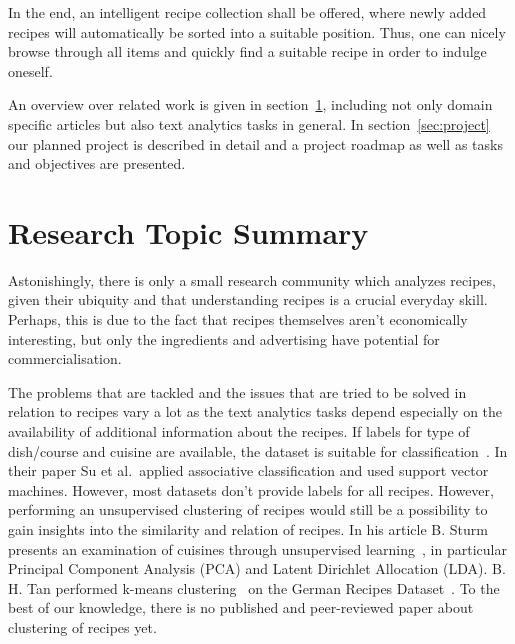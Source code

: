 \documentclass[
     12pt,         %
     a4paper,      %
     BCOR10mm,     %
     DIV14,        %
     ]{article}
\begin{document}
In the end, an intelligent recipe collection shall be offered, where newly added recipes will automatically be sorted into a suitable position. Thus, one can nicely browse through all items and quickly find a suitable recipe in order to indulge oneself.

An overview over related work is given in section~\ref{sec:research}, including not only domain specific articles but also text analytics tasks in general. In section~\ref{sec:project} our planned project is described in detail and a project roadmap as well as tasks and objectives are presented.

\section{Research Topic Summary}
\label{sec:research}

Astonishingly, there is only a small research community which analyzes recipes, given their ubiquity and that understanding recipes is a crucial everyday skill. Perhaps, this is due to the fact that recipes themselves aren't economically interesting, but only the ingredients and advertising have potential for commercialisation.

The problems that are tackled and the issues that are tried to be solved in relation to recipes vary a lot as the text analytics tasks depend especially on the availability of additional information about the recipes. If labels for type of dish/course and cuisine are available, the dataset is suitable for classification~\cite{recipeclassification, cultdiffusion}. In their paper Su et al.~applied associative classification and used support vector machines. However, most datasets don't provide labels for all recipes. However, performing an unsupervised clustering of recipes would still be a possibility to gain insights into the similarity and relation of recipes. In his article B. Sturm presents an examination of cuisines through unsupervised learning~\cite{unsupervisedclustering}, in particular Principal Component Analysis (PCA) and Latent Dirichlet Allocation (LDA). B. H. Tan performed k-means clustering~\cite{clusteringrecipes} on the German Recipes Dataset~\cite{germanrecipesdataset}. To the best of our knowledge, there is no published and peer-reviewed paper about clustering of recipes yet.
\end{document}
